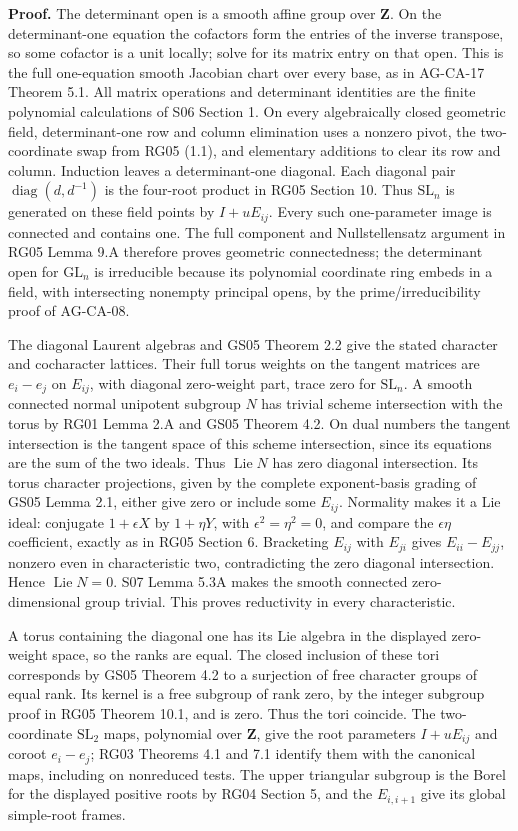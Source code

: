\documentclass[11pt,a4paper,openany]{report}
\newcounter{none}
\begin{document}
\textbf{Proof.} The determinant open is a smooth affine group over \(\mathbf Z\). On the determinant-one equation the cofactors form the entries of the inverse transpose, so some cofactor is a unit locally; solve for its matrix entry on that open. This is the full one-equation smooth Jacobian chart over every base, as in AG-CA-17 Theorem 5.1. All matrix operations and determinant identities are the finite polynomial calculations of S06 Section 1. On every algebraically closed geometric field, determinant-one row and column elimination uses a nonzero pivot, the two-coordinate swap from RG05 (1.1), and elementary additions to clear its row and column. Induction leaves a determinant-one diagonal. Each diagonal pair \(\operatorname{diag}(d,d^{-1})\) is the four-root product in RG05 Section 10. Thus \(\mathrm{SL}_n\) is generated on these field points by \(I+uE_{ij}\). Every such one-parameter image is connected and contains one. The full component and Nullstellensatz argument in RG05 Lemma 9.A therefore proves geometric connectedness; the determinant open for \(\mathrm{GL}_n\) is irreducible because its polynomial coordinate ring embeds in a field, with intersecting nonempty principal opens, by the prime/irreducibility proof of AG-CA-08.

The diagonal Laurent algebras and GS05 Theorem 2.2 give the stated character and cocharacter lattices. Their full torus weights on the tangent matrices are \(e_i-e_j\) on \(E_{ij}\), with diagonal zero-weight part, trace zero for \(\mathrm{SL}_n\). A smooth connected normal unipotent subgroup \(N\) has trivial scheme intersection with the torus by RG01 Lemma 2.A and GS05 Theorem 4.2. On dual numbers the tangent intersection is the tangent space of this scheme intersection, since its equations are the sum of the two ideals. Thus \(\operatorname{Lie}N\) has zero diagonal intersection. Its torus character projections, given by the complete exponent-basis grading of GS05 Lemma 2.1, either give zero or include some \(E_{ij}\). Normality makes it a Lie ideal: conjugate \(1+\epsilon X\) by \(1+\eta Y\), with \(\epsilon^2=\eta^2=0\), and compare the \(\epsilon\eta\) coefficient, exactly as in RG05 Section 6. Bracketing \(E_{ij}\) with \(E_{ji}\) gives \(E_{ii}-E_{jj}\), nonzero even in characteristic two, contradicting the zero diagonal intersection. Hence \(\operatorname{Lie}N=0\). S07 Lemma 5.3A makes the smooth connected zero-dimensional group trivial. This proves reductivity in every characteristic.

A torus containing the diagonal one has its Lie algebra in the displayed zero-weight space, so the ranks are equal. The closed inclusion of these tori corresponds by GS05 Theorem 4.2 to a surjection of free character groups of equal rank. Its kernel is a free subgroup of rank zero, by the integer subgroup proof in RG05 Theorem 10.1, and is zero. Thus the tori coincide. The two-coordinate \(\mathrm{SL}_2\) maps, polynomial over \(\mathbf Z\), give the root parameters \(I+uE_{ij}\) and coroot \(e_i-e_j\); RG03 Theorems 4.1 and 7.1 identify them with the canonical maps, including on nonreduced tests. The upper triangular subgroup is the Borel for the displayed positive roots by RG04 Section 5, and the \(E_{i,i+1}\) give its global simple-root frames.
\end{document}
